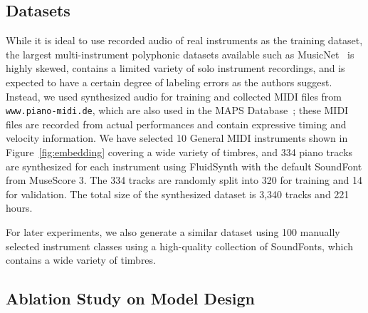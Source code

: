 \subsection{Datasets}

While it is ideal to use recorded audio of real instruments as the training dataset, the largest multi-instrument polyphonic datasets available such as MusicNet~\cite{thickstun2017musicnet} is highly skewed, contains a limited variety of solo instrument recordings, and is expected to have a certain degree of labeling errors as the authors suggest.
Instead, we used synthesized audio for training and collected MIDI files from \texttt{www.piano-midi.de}, which are also used in the MAPS Database~\cite{emiya2010smoothness}; these MIDI files are recorded from actual performances and contain expressive timing and velocity information.
We have selected 10 General MIDI instruments shown in Figure~\ref{fig:embedding} covering a wide variety of timbres, and 334 piano tracks are synthesized for each instrument using FluidSynth with the default SoundFont from MuseScore 3.
The 334 tracks are randomly split into 320 for training and 14 for validation.
The total size of the synthesized dataset is 3,340 tracks and 221 hours.

For later experiments, we also generate a similar dataset using 100 manually selected instrument classes using a high-quality collection of SoundFonts, which contains a wide variety of timbres.


\subsection{Ablation Study on Model Design}

